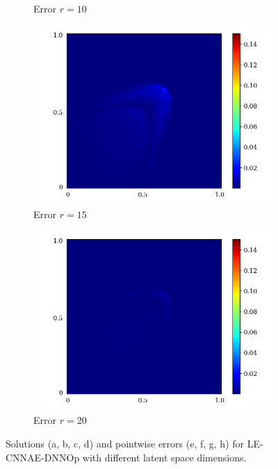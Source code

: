 \begin{figure}[ht!]
\begin{center}
\begin{subfigure}[b]{0.20\textwidth}
\begin{center}
             \end{center}
             \caption{Error $r = 10$}
         \end{subfigure}   
         \begin{subfigure}[b]{0.20\textwidth}
             \begin{center}
                \includegraphics[trim = {0, 0, 3cm, 0}, clip, width=\textwidth]{Pictures/X-rom-LE-CNNAE-15-abs-err.png}
             \end{center}
             \caption{Error $r = 15$}
         \end{subfigure}    
         \begin{subfigure}[b]{0.20\textwidth}
             \begin{center}
                \includegraphics[trim = {0, 0, 3cm, 0}, clip, width=\textwidth]{Pictures/X-rom-LE-CNNAE-20-abs-err.png}
             \end{center}
             \caption{Error $r = 20$}
         \end{subfigure}
     \end{center}
     \caption[Solutions and pointwise errors for LE-CNNAE-DNNOp.]{Solutions (a, b, c, d) and pointwise errors (e, f, g, h) for LE-CNNAE-DNNOp with different latent space dimensions.}
        \label{fig: lecnnae-burger}
\end{figure}

